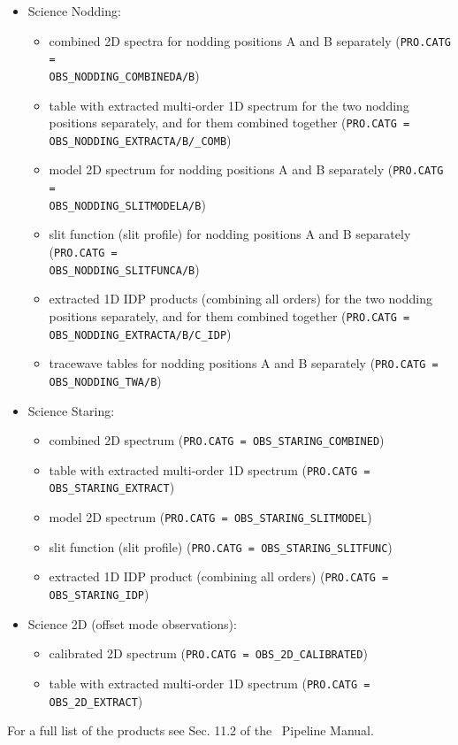 \begin{itemize}
\item Science Nodding: 
\begin{itemize}
\item combined 2D spectra for nodding positions A and B separately ({\tt PRO.CATG =\\ OBS\_NODDING\_COMBINEDA/B})
\item table with extracted multi-order 1D spectrum for the two nodding positions separately, and for them combined together  ({\tt PRO.CATG = OBS\_NODDING\_EXTRACTA/B/\_COMB})
\item model 2D spectrum for nodding positions A and B separately ({\tt PRO.CATG =\\ OBS\_NODDING\_SLITMODELA/B})
\item slit function (slit profile) for nodding positions A and B separately ({\tt PRO.CATG =\\ OBS\_NODDING\_SLITFUNCA/B})
\item extracted 1D IDP products (combining all orders) for the two nodding positions separately, and for them combined together ({\tt PRO.CATG = OBS\_NODDING\_EXTRACTA/B/C\_IDP})
\item tracewave tables for nodding positions A and B separately ({\tt PRO.CATG = OBS\_NODDING\_TWA/B})
\end{itemize}

\item Science Staring: 
\begin{itemize}
\item combined 2D spectrum ({\tt PRO.CATG = OBS\_STARING\_COMBINED})
\item table with extracted multi-order 1D spectrum ({\tt PRO.CATG = OBS\_STARING\_EXTRACT})
\item model 2D spectrum ({\tt PRO.CATG = OBS\_STARING\_SLITMODEL})
\item slit function (slit profile) ({\tt PRO.CATG = OBS\_STARING\_SLITFUNC})
\item extracted 1D IDP product (combining all orders) ({\tt PRO.CATG = OBS\_STARING\_IDP})
\end{itemize}

\item Science 2D (offset mode observations): 
\begin{itemize}
\item calibrated 2D spectrum ({\tt PRO.CATG = OBS\_2D\_CALIBRATED})
\item table with extracted multi-order 1D spectrum ({\tt PRO.CATG = OBS\_2D\_EXTRACT})
\end{itemize}

\end{itemize}

For a full list of the products see Sec. 11.2 of the \instname\ Pipeline Manual.

